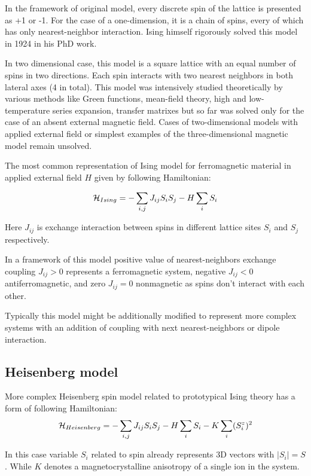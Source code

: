 In the framework of original model, every discrete spin of the lattice is presented as +1 or -1.
For the case of a one-dimension, it is a chain of spins, every of which has only nearest-neighbor interaction. Ising himself rigorously solved this model in 1924 in his PhD work.

In two dimensional case, this model is a square lattice with an equal number of spins in two directions. Each spin interacts with two nearest neighbors in both lateral axes (4 in total). This model was intensively studied theoretically by various methods like Green functions, mean-field theory, high and low-temperature series expansion, transfer matrixes but so far was solved only for the case of an absent external magnetic field.  Cases of two-dimensional models with applied external field or simplest examples of the three-dimensional magnetic model remain unsolved.

The most common representation of Ising model for ferromagnetic material in applied external field $H$ given by following Hamiltonian:

\begin{equation}
{\cal H}_{Ising} = -\sum \limits_{i, j} J_{ij} S_i S_j - H \sum \limits_{i} S_i
\end{equation}

Here $J_{ij}$ is exchange interaction between spins in different lattice sites $S_i$ and $S_j$ respectively.

In a framework of this model positive value of nearest-neighbors exchange coupling $J_{ij}>0$ represents a ferromagnetic system, negative $J_{ij}<0$ antiferromagnetic, and zero $J_{ij}=0$ nonmagnetic as spins don't interact with each other.

Typically this model might be additionally modified to represent more complex systems with an addition of coupling with next nearest-neighbors or dipole interaction.

\subsection{Heisenberg model}
More complex Heisenberg spin model related to prototypical Ising theory has a form of following Hamiltonian:
\begin{equation}
{\cal H}_{Heisenberg} = -\sum \limits_{i, j} J_{ij} S_i S_j - H \sum \limits_{i} S_i - K\sum \limits_{i} (S_i^z)^2
\end{equation}

In this case variable $S_i$ related to spin already represents 3D vectors with $|S_i| = S$. While $K$ denotes a magnetocrystalline anisotropy of a single ion in the system.

